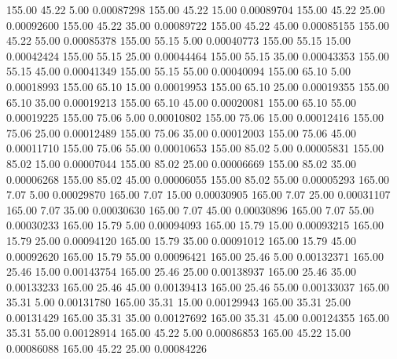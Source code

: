     155.00     45.22      5.00     0.00087298
    155.00     45.22     15.00     0.00089704
    155.00     45.22     25.00     0.00092600
    155.00     45.22     35.00     0.00089722
    155.00     45.22     45.00     0.00085155
    155.00     45.22     55.00     0.00085378
    155.00     55.15      5.00     0.00040773
    155.00     55.15     15.00     0.00042424
    155.00     55.15     25.00     0.00044464
    155.00     55.15     35.00     0.00043353
    155.00     55.15     45.00     0.00041349
    155.00     55.15     55.00     0.00040094
    155.00     65.10      5.00     0.00018993
    155.00     65.10     15.00     0.00019953
    155.00     65.10     25.00     0.00019355
    155.00     65.10     35.00     0.00019213
    155.00     65.10     45.00     0.00020081
    155.00     65.10     55.00     0.00019225
    155.00     75.06      5.00     0.00010802
    155.00     75.06     15.00     0.00012416
    155.00     75.06     25.00     0.00012489
    155.00     75.06     35.00     0.00012003
    155.00     75.06     45.00     0.00011710
    155.00     75.06     55.00     0.00010653
    155.00     85.02      5.00     0.00005831
    155.00     85.02     15.00     0.00007044
    155.00     85.02     25.00     0.00006669
    155.00     85.02     35.00     0.00006268
    155.00     85.02     45.00     0.00006055
    155.00     85.02     55.00     0.00005293
    165.00      7.07      5.00     0.00029870
    165.00      7.07     15.00     0.00030905
    165.00      7.07     25.00     0.00031107
    165.00      7.07     35.00     0.00030630
    165.00      7.07     45.00     0.00030896
    165.00      7.07     55.00     0.00030233
    165.00     15.79      5.00     0.00094093
    165.00     15.79     15.00     0.00093215
    165.00     15.79     25.00     0.00094120
    165.00     15.79     35.00     0.00091012
    165.00     15.79     45.00     0.00092620
    165.00     15.79     55.00     0.00096421
    165.00     25.46      5.00     0.00132371
    165.00     25.46     15.00     0.00143754
    165.00     25.46     25.00     0.00138937
    165.00     25.46     35.00     0.00133233
    165.00     25.46     45.00     0.00139413
    165.00     25.46     55.00     0.00133037
    165.00     35.31      5.00     0.00131780
    165.00     35.31     15.00     0.00129943
    165.00     35.31     25.00     0.00131429
    165.00     35.31     35.00     0.00127692
    165.00     35.31     45.00     0.00124355
    165.00     35.31     55.00     0.00128914
    165.00     45.22      5.00     0.00086853
    165.00     45.22     15.00     0.00086088
    165.00     45.22     25.00     0.00084226
